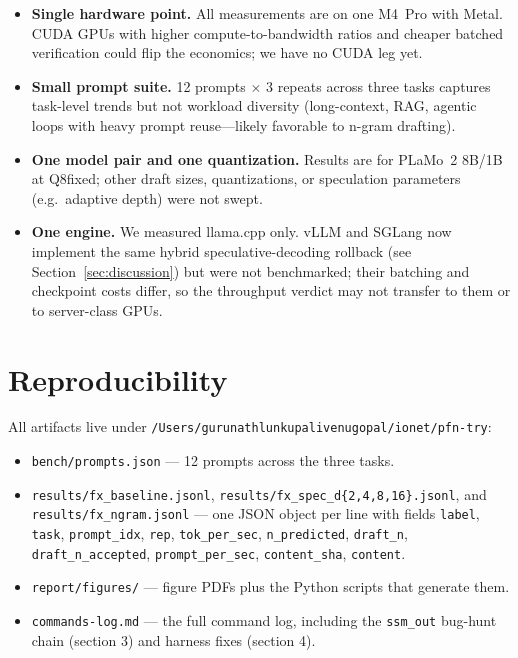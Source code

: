 \documentclass[10pt]{article}
\newcommand{\code}[1]{\texttt{#1}}
\begin{document}
\begin{itemize}
  \item \textbf{Single hardware point.} All measurements are on one M4~Pro
    with Metal. CUDA GPUs with higher compute-to-bandwidth ratios and
    cheaper batched verification could flip the economics; we have no CUDA
    leg yet.
  \item \textbf{Small prompt suite.} 12 prompts $\times$ 3 repeats across
    three tasks captures task-level trends but not workload diversity
    (long-context, RAG, agentic loops with heavy prompt reuse---likely
    favorable to n-gram drafting).
  \item \textbf{One model pair and one quantization.} Results are for
    PLaMo~2 8B/1B at Q8fixed; other draft sizes, quantizations, or
    speculation parameters (e.g.\ adaptive depth) were not swept.
  \item \textbf{One engine.} We measured llama.cpp only. vLLM and SGLang now
    implement the same hybrid speculative-decoding rollback (see
    Section~\ref{sec:discussion}) but were not benchmarked; their batching
    and checkpoint costs differ, so the throughput verdict may not transfer
    to them or to server-class GPUs.
\end{itemize}

\section{Reproducibility}

All artifacts live under
\code{/Users/gurunathlunkupalivenugopal/ionet/pfn-try}:

\begin{itemize}
  \item \code{bench/prompts.json} --- 12 prompts across the three tasks.
  \item \code{results/fx\_baseline.jsonl},
    \code{results/fx\_spec\_d\{2,4,8,16\}.jsonl}, and
    \code{results/fx\_ngram.jsonl} --- one JSON object per line with
    fields \code{label}, \code{task}, \code{prompt\_idx}, \code{rep},
    \code{tok\_per\_sec}, \code{n\_predicted}, \code{draft\_n},
    \code{draft\_n\_accepted}, \code{prompt\_per\_sec},
    \code{content\_sha}, \code{content}.
  \item \code{report/figures/} --- figure PDFs plus the Python scripts that
    generate them.
  \item \code{commands-log.md} --- the full command log, including the
    \code{ssm\_out} bug-hunt chain (section 3) and harness fixes
    (section 4).
\end{itemize}
\end{document}
